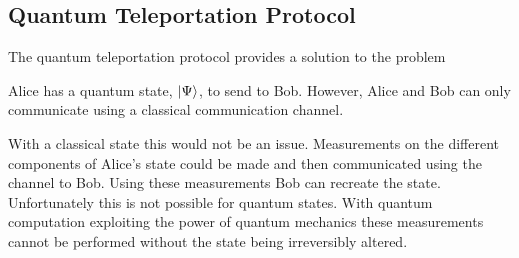 \subsection{Quantum Teleportation Protocol}
\label{sec:quantteleproto}

The quantum teleportation protocol provides a solution to the problem
\begin{center}
Alice has a quantum state, $\left\vert{\Psi}\right\rangle$, to send to Bob.
However, Alice and Bob can only communicate using a classical communication channel.
\end{center}

With a classical state this would not be an issue.
Measurements on the different components of Alice's state could be made and then communicated using the channel to Bob.
Using these measurements Bob can recreate the state.
Unfortunately this is not possible for quantum states.
With quantum computation exploiting the power of quantum mechanics these measurements cannot be performed without the state being irreversibly altered.

% 
% 


